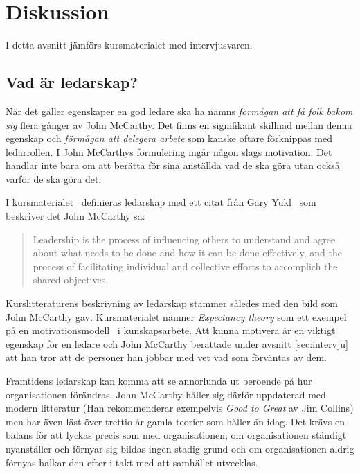 \section{Diskussion}

I detta avsnitt jämförs kursmaterialet med intervjusvaren.

\subsection{Vad är ledarskap?}
När det gäller egenskaper en god ledare ska ha nämns \textit{förmågan att få folk bakom sig} flera gånger av John McCarthy. Det finns en signifikant skillnad mellan denna egenskap och \textit{förmågan att delegera arbete} som kanske oftare förknippas med ledarrollen. I John McCarthys formulering ingår någon slags motivation. Det handlar inte bara om att berätta för sina anställda vad de ska göra utan också varför de ska göra det.

I kursmaterialet~\citep{leadership} definieras ledarskap med ett citat från Gary Yukl~\citep{yukl} som beskriver det John McCarthy sa:
\begin{quote}
Leadership is the process of influencing others to understand 
and agree about what needs to be done and how it can be 
done effectively, and the process of facilitating individual and 
collective efforts to accomplich the shared objectives.
\end{quote}

Kurslitteraturens beskrivning av ledarskap stämmer således med den bild som John McCarthy gav. Kursmaterialet nämner \textit{Expectancy theory} som ett exempel på en motivationsmodell~\cite{motivation} i kunskapsarbete. Att kunna motivera är en viktigt egenskap för en ledare och John McCarthy berättade under avsnitt \ref{sec:intervju} att han tror att de personer han jobbar med vet vad som förväntas av dem.

Framtidens ledarskap kan komma att se annorlunda ut beroende på hur organisationen förändras. John McCarthy håller sig därför uppdaterad med modern litteratur (Han rekommenderar exempelvis \textit{Good to Great} av Jim Collins) men har även läst över trettio år gamla teorier som håller än idag. Det krävs en balans för att lyckas precis som med organisationen; om organisationen ständigt nyanställer och förnyar sig bildas ingen stadig grund och om organisationen aldrig förnyas halkar den efter i takt med att samhället utvecklas.


